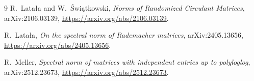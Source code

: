 \documentclass[11pt]{article}
\begin{document}
\begin{thebibliography}{9}
R.~Lata\l a and W.~\'Swi\k atkowski,
\emph{Norms of Randomized Circulant Matrices},
arXiv:2106.03139,
\url{https://arxiv.org/abs/2106.03139}.

R.~Lata\l a,
\emph{On the spectral norm of Rademacher matrices},
arXiv:2405.13656,
\url{https://arxiv.org/abs/2405.13656}.

R.~Meller,
\emph{Spectral norm of matrices with independent entries up to polyloglog},
arXiv:2512.23673,
\url{https://arxiv.org/abs/2512.23673}.
\end{thebibliography}
\end{document}
